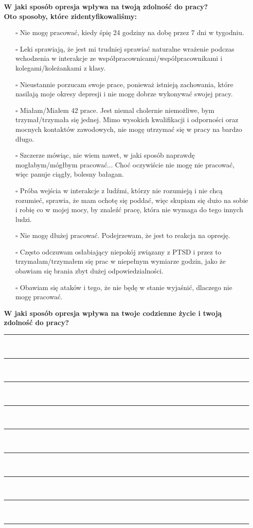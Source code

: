 \noindent\textcolor{ProcessBlue}{\textbf{\Large{W jaki sposób opresja wpływa na twoją zdolność do pracy?}}}\\
\textbf{\large{Oto sposoby, które zidentyfikowaliśmy:}}
\begin{multicols}{2}
\begin{itemize}
\item[$\square$]{Nie mogę pracować, kiedy śpię 24 godziny na dobę przez 7 dni w tygodniu.}
\item[$\square$]{Leki sprawiają, że jest mi trudniej sprawiać naturalne wrażenie podczas wchodzenia w interakcje ze współpracownicami/współpracownikami i kolegami/koleżankami z klasy.}
\item[$\square$]{Nieustannie porzucam swoje prace, ponieważ istnieją zachowania, które nasilają moje okresy depresji i nie mogę dobrze wykonywać swojej pracy.}
\item[$\square$]{Miałam/Miałem 42 prace. Jest niemal cholernie niemożliwe, bym trzymał/trzymała się jednej. Mimo wysokich kwalifikacji i odporności oraz mocnych kontaktów zawodowych, nie mogę utrzymać się w pracy na bardzo długo.}
\item[$\square$]{Szczerze mówiąc, nie wiem nawet, w jaki sposób naprawdę mogłabym/mógłbym pracować... Choć oczywiście nie mogę nie pracować, więc panuje ciągły, bolesny bałagan.}
\item[$\square$]{Próba wejścia w interakcje z ludźmi, którzy nie rozumieją i nie chcą rozumieć, sprawia, że mam ochotę się poddać, więc skupiam się dużo na sobie i robię co w mojej mocy, by znaleźć pracę, która nie wymaga do tego innych ludzi.}
\item[$\square$]{Nie mogę dłużej pracować. Podejrzewam, że jest to reakcja na opresję.}
\item[$\square$]{Często odczuwam osłabiający niepokój związany z PTSD i przez to trzymałam/trzymałem się prac w niepełnym wymiarze godzin, jako że obawiam się brania zbyt dużej odpowiedzialności.}
\item[$\square$]{Obawiam się ataków i tego, że nie będę w stanie wyjaśnić, dlaczego nie mogę pracować.}
\end{itemize}
\end{multicols}


\newpage
\noindent
\textcolor{ProcessBlue}{\textbf{\Large{W jaki sposób opresja wpływa na twoje codzienne życie i twoją zdolność do pracy?}}}\\
\noindent\rule{\textwidth}{1pt}\\
\noindent\rule{\textwidth}{1pt}\\
\noindent\rule{\textwidth}{1pt}\\
\noindent\rule{\textwidth}{1pt}\\
\noindent\rule{\textwidth}{1pt}\\
\noindent\rule{\textwidth}{1pt}\\
\noindent\rule{\textwidth}{1pt}\\
\noindent\rule{\textwidth}{1pt}\\
\noindent\rule{\textwidth}{1pt}\\\\

